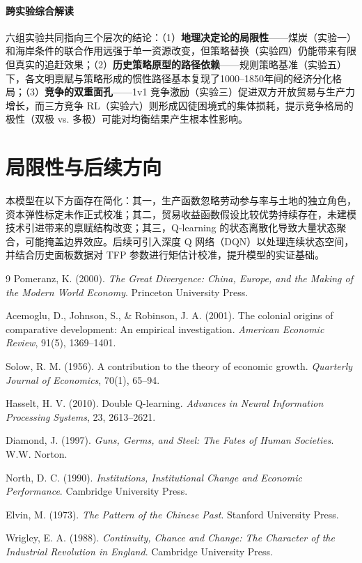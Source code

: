 \documentclass[12pt, a4paper]{article}
\begin{document}
\paragraph{跨实验综合解读} 六组实验共同指向三个层次的结论：（1）\textbf{地理决定论的局限性}——煤炭（实验一）和海岸条件的联合作用远强于单一资源改变，但策略替换（实验四）仍能带来有限但真实的追赶效果；（2）\textbf{历史策略原型的路径依赖}——规则策略基准（实验五）下，各文明禀赋与策略形成的惯性路径基本复现了1000–1850年间的经济分化格局；（3）\textbf{竞争的双重面孔}——1v1 竞争激励（实验三）促进双方开放贸易与生产力增长，而三方竞争 RL（实验六）则形成囚徒困境式的集体损耗，提示竞争格局的极性（双极 vs. 多极）可能对均衡结果产生根本性影响。

\section{局限性与后续方向}

本模型在以下方面存在简化：其一，生产函数忽略劳动参与率与土地的独立角色，资本弹性标定未作正式校准；其二，贸易收益函数假设比较优势持续存在，未建模技术引进带来的禀赋结构改变；其三，Q-learning 的状态离散化导致大量状态聚合，可能掩盖边界效应。后续可引入深度 Q 网络（DQN）以处理连续状态空间，并结合历史面板数据对 TFP 参数进行矩估计校准，提升模型的实证基础。

\begin{thebibliography}{9}
 Pomeranz, K. (2000). \textit{The Great Divergence: China, Europe, and the Making of the Modern World Economy}. Princeton University Press.

 Acemoglu, D., Johnson, S., \& Robinson, J. A. (2001). The colonial origins of comparative development: An empirical investigation. \textit{American Economic Review}, 91(5), 1369--1401.

 Solow, R. M. (1956). A contribution to the theory of economic growth. \textit{Quarterly Journal of Economics}, 70(1), 65--94.

 Hasselt, H. V. (2010). Double Q-learning. \textit{Advances in Neural Information Processing Systems}, 23, 2613--2621.

 Diamond, J. (1997). \textit{Guns, Germs, and Steel: The Fates of Human Societies}. W.W. Norton.

 North, D. C. (1990). \textit{Institutions, Institutional Change and Economic Performance}. Cambridge University Press.

 Elvin, M. (1973). \textit{The Pattern of the Chinese Past}. Stanford University Press.

 Wrigley, E. A. (1988). \textit{Continuity, Chance and Change: The Character of the Industrial Revolution in England}. Cambridge University Press.
\end{thebibliography}
\end{document}
